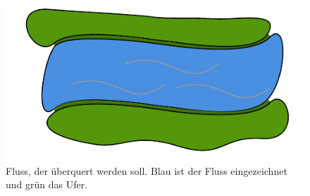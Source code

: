 \begin{figure}
%
%
%
%
    \includegraphics{papers/schwimmen/tikz/fluss.pdf}
    \caption{Fluss, der überquert werden soll. Blau ist der Fluss eingezeichnet und grün das Ufer.}
    \label{fig:river_original}
\end{figure}
